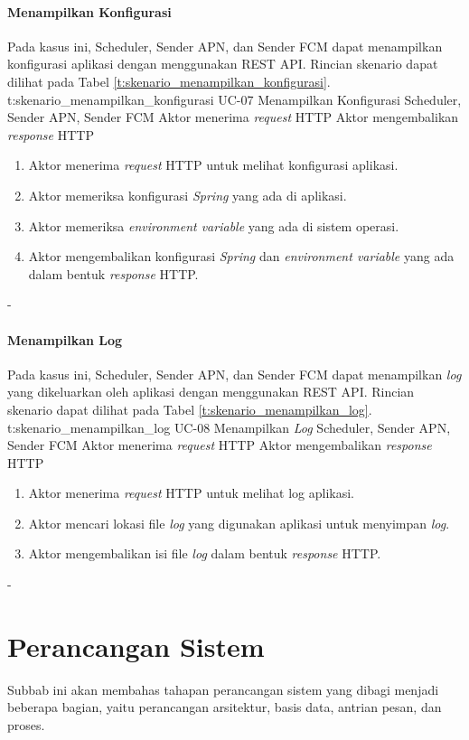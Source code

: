 \paragraph{Menampilkan Konfigurasi}
\par Pada kasus ini, Scheduler, Sender APN, dan Sender FCM dapat menampilkan konfigurasi aplikasi dengan menggunakan REST API. Rincian skenario dapat dilihat pada Tabel \ref{t:skenario_menampilkan_konfigurasi}.
\tableUcDesc
{t:skenario_menampilkan_konfigurasi}
{UC-07}
{Menampilkan Konfigurasi}
{Scheduler, Sender APN, Sender FCM}
{Aktor menerima \textit{request} HTTP}
{Aktor mengembalikan \textit{response} HTTP}
{
	\begin{enumerate}
		\item Aktor menerima \textit{request} HTTP untuk melihat konfigurasi aplikasi.
		\item Aktor memeriksa konfigurasi \textit{Spring} yang ada di aplikasi.
		\item Aktor memeriksa \textit{environment variable} yang ada di sistem operasi.
		\item Aktor mengembalikan konfigurasi \textit{Spring} dan \textit{environment variable} yang ada dalam bentuk \textit{response} HTTP.
	\end{enumerate}
}
{-}

\paragraph{Menampilkan Log}
\par Pada kasus ini, Scheduler, Sender APN, dan Sender FCM dapat menampilkan \textit{log} yang dikeluarkan oleh aplikasi dengan menggunakan REST API. Rincian skenario dapat dilihat pada Tabel \ref{t:skenario_menampilkan_log}.
\tableUcDesc
{t:skenario_menampilkan_log}
{UC-08}
{Menampilkan \textit{Log}}
{Scheduler, Sender APN, Sender FCM}
{Aktor menerima \textit{request} HTTP}
{Aktor mengembalikan \textit{response} HTTP}
{
\begin{enumerate}
	\item Aktor menerima \textit{request} HTTP untuk melihat log aplikasi.
	\item Aktor mencari lokasi file \textit{log} yang digunakan aplikasi untuk menyimpan \textit{log}.
	\item Aktor mengembalikan isi file \textit{log} dalam bentuk \textit{response} HTTP.
\end{enumerate}
}
{-}

\section{Perancangan Sistem}
\par Subbab ini akan membahas tahapan perancangan sistem yang dibagi menjadi beberapa bagian, yaitu perancangan arsitektur, basis data, antrian pesan, dan proses.

